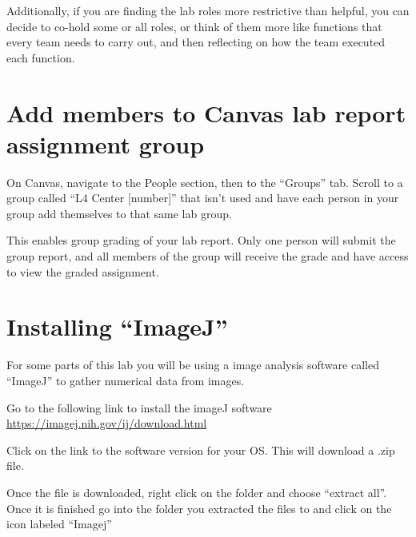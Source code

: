 Additionally, if you are finding the lab roles more restrictive than helpful, you can decide to co-hold some or all roles, or think of them more like functions that every team needs to carry out, and then reflecting on how the team executed each function.

\section{Add members to Canvas lab report assignment group}

\begin{steps}
	\item On Canvas, navigate to the People section, then to the ``Groups'' tab. Scroll to a group called ``L4 Center [number]'' that isn't used and have each person in your group add themselves to that same lab group.
\end{steps}

This enables group grading of your lab report. Only one person will submit the group report, and all members of the group will receive the grade and have access to view the graded assignment.

\section{Installing ``ImageJ''}
For some parts of this lab you will be using a image analysis software called ``ImageJ'' to gather numerical data from images.
\begin{steps}
	\item Go to the following link to install the imageJ software \url{https://imagej.nih.gov/ij/download.html}
	\item Click on the link to the software version for your OS. This will download a .zip file.
	\item Once the file is downloaded, right click on the folder and choose ``extract all''. Once it is finished go into the folder you extracted the files to and click on the icon labeled ``Imagej''
\end{steps}



